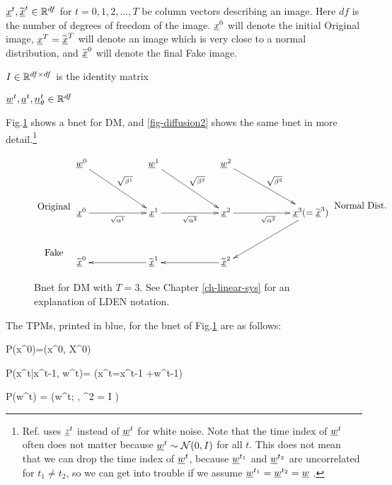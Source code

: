 ${\underline{x}}^t, {\widetilde{{\underline{x}}}}^t\in { \mathbb{R}}^{df}$ for $t=0, 1, 2,
\ldots, T$ be column vectors
describing an image. Here $df$
is the number of degrees of freedom 
of the image. ${\underline{x}}^0$ 
will denote the initial Original image,
${\underline{x}}^T={\widetilde{{\underline{x}}}}^T$
will denote an image which 
is very close to a 
normal distribution,
and ${\widetilde{{\underline{x}}}}^0$
will denote the final Fake image.

$I\in { \mathbb{R}}^{df\times df}$ is the 
identity matrix

${\underline{w}}^t, {\underline{a}}^t,
{\underline{n}}^t_\theta \in{ \mathbb{R}}^{df}$



Fig.\ref{fig-diffusion1} shows a
bnet for DM, and  
\ref{fig-diffusion2}
shows the same bnet 
in more detail.\footnote{
Ref.\cite{weng-diffusion-model} uses ${\underline{z}}^{t}$ 
instead of ${\underline{w}}^{t}$
for white noise.
Note that 
the time index
of 
${\underline{w}}^{t}$
often does not matter
because 
${\underline{w}}^{t}\sim {\cal N}(0, I)$
for all $t$.
This does not mean
that we can drop the
time index of ${\underline{w}}^t$,
because ${\underline{w}}^{t_1}$
and ${\underline{w}}^{t_2}$
are uncorrelated for $t_1\neq t_2$,
so we can get into 
trouble if we assume
${\underline{w}}^{t_1}={\underline{w}}^{t_2}={\underline{w}}$ .
}

\begin{figure}[h!]
$$
\xymatrix@C=5pc@R=3pc{
\\
\text{Original}
\\
\text{Fake}
}
\xymatrix@C=5pc@R=3pc{
\rvw^0\ar[dr]^{\sqrt{\beta^1}}
&\rvw^1\ar[dr]^{\sqrt{\beta^2}}
&\rvw^2\ar[dr]^{\sqrt{\beta^3}}
\\
\rvx^0\ar[r]_{\sqrt{\alp^1}}
&\rvx^1\ar[r]_{\sqrt{\alp^2}}
&\rvx^2\ar[r]_{\sqrt{\alp^3}}
&\rvx^3(= \TIL{\rvx}^3)\ar[dl]
\\
\TIL{\rvx}^0
&\TIL{\rvx}^1\ar[l]
&\TIL{\rvx}^2\ar[l]
&
}
\xymatrix@C=5pc@R=3pc{
\\
\text{Normal Dist.}
}
$$
\caption{Bnet for DM with $T=3$.
See Chapter \ref{ch-linear-sys}
 for an explanation of LDEN notation.}
\label{fig-diffusion1}
\end{figure}


The TPMs, printed in blue,
for the bnet of Fig.\ref{fig-diffusion1}
are as follows:

\beq \color{blue}
P(x^0)=\delta(x^0, X^0)
\quad {}
\eeq

\beq \color{blue}
P(x^t|x^{t-1}, w^{t})=
\indi(\quad x^t=\;x^{t-1}
+\;w^{t-1}\quad)
\eeq

\beq \color{blue}
P(w^t) = \caln(w^t; ,
 \s^2 =  I ) \quad {}
\eeq

